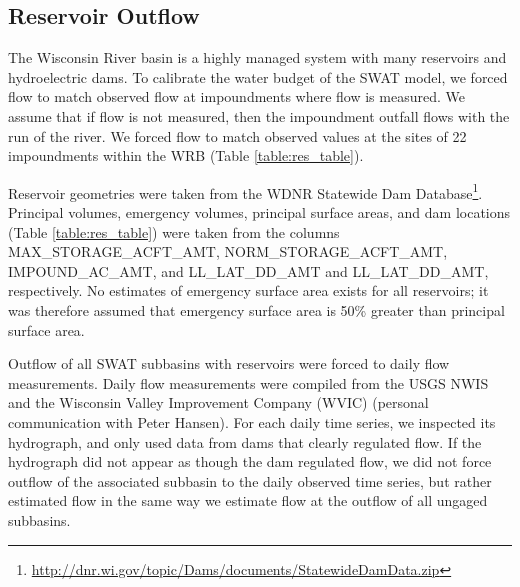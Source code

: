 \subsection{Reservoir Outflow}\label{sec:reservoirs}

The Wisconsin River basin is a highly managed system with many reservoirs and hydroelectric dams. To calibrate the water budget of the SWAT model, we forced flow to match observed flow at impoundments where flow is measured. We assume that if flow is not measured, then the impoundment outfall flows with the run of the river. We forced flow to match observed values at the sites of 22 impoundments within the WRB (Table \ref{table:res_table}).

Reservoir geometries were taken from the WDNR Statewide Dam Database\footnote{\url{http://dnr.wi.gov/topic/Dams/documents/StatewideDamData.zip}}. Principal volumes, emergency volumes, principal surface areas, and dam locations (Table \ref{table:res_table}) were taken from the columns MAX\_STORAGE\_ACFT\_AMT, NORM\_STORAGE\_ACFT\_AMT, IMPOUND\_AC\_AMT, and LL\_LAT\_DD\_AMT and LL\_LAT\_DD\_AMT, respectively. No estimates of emergency surface area exists for all reservoirs; it was therefore assumed that emergency surface area is 50\% greater than principal surface area.

Outflow of all SWAT subbasins with reservoirs were forced to daily flow measurements. Daily flow measurements were compiled from the USGS NWIS \citep{usgs_nwis_2014} and the Wisconsin Valley Improvement Company (WVIC) (personal communication with Peter Hansen). For each daily time series, we inspected its hydrograph, and only used data from dams that clearly regulated flow. If the hydrograph did not appear as though the dam regulated flow, we did not force outflow of the associated subbasin to the daily observed time series, but rather estimated flow in the same way we estimate flow at the outflow of all ungaged subbasins. 
